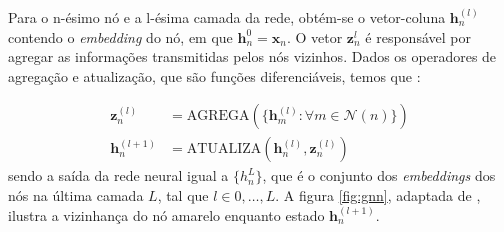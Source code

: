 Para o n-ésimo nó e a l-ésima camada da rede, obtém-se o vetor-coluna
$\mathbf{h}^{(l)}_n$ contendo o \textit{embedding} do nó, em que
$\mathbf{h}^{0}_n = \mathbf{x}_n$. O vetor $\mathbf{z}^{l}_n$ é responsável
por agregar as informações transmitidas pelos nós vizinhos. Dados os operadores
de agregação e atualização, que são funções diferenciáveis, temos que \cite{Bishop:DeepLearning24}:

\begin{align}
    \mathbf{z}^{(l)}_n &= \text{AGREGA}( \{ \mathbf{h}^{(l)}_m : \forall m \in \mathcal{N}(n)\} ) \label{eq:agrega} \\
    \mathbf{h}^{(l+1)}_n &= \text{ATUALIZA}(\mathbf{h}^{(l)}_n, \mathbf{z}^{(l)}_n) \label{eq:atualiza}
\end{align}
sendo a saída da rede neural igual a $\{h^{L}_n\}$, que é o conjunto dos
\textit{embeddings} dos nós na última camada $L$, tal que $l \in {0, \ldots,
L}$. A figura \ref{fig:gnn}, adaptada de \citet{graph_rep_learning}, ilustra
a vizinhança do nó amarelo enquanto estado $\mathbf{h}^{(l+1)}_n$.

